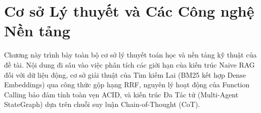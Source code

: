 \chapter{Cơ sở Lý thuyết và Các Công nghệ Nền tảng}
\label{chap:co_so_ly_thuyet}

Chương này trình bày toàn bộ cơ sở lý thuyết toán học và nền tảng kỹ thuật của đề tài. Nội dung đi sâu vào việc phân tích các giới hạn của kiến trúc Naive RAG đối với dữ liệu động, cơ sở giải thuật của Tìm kiếm Lai (BM25 kết hợp Dense Embeddings) qua công thức gộp hạng RRF, nguyên lý hoạt động của Function Calling bảo đảm tính toàn vẹn ACID, và kiến trúc Đa Tác tử (Multi-Agent StateGraph) dựa trên chuỗi suy luận Chain-of-Thought (CoT).





